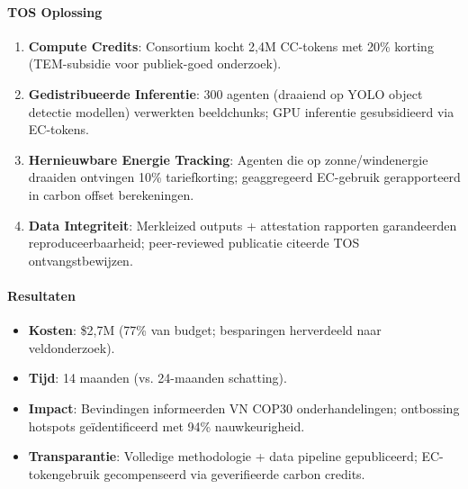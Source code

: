 \documentclass[11pt]{article}
\begin{document}
\paragraph{TOS Oplossing}
\begin{enumerate}[noitemsep]
  \item \textbf{Compute Credits}: Consortium kocht 2,4M CC-tokens met 20\% korting (TEM-subsidie voor publiek-goed onderzoek).
  \item \textbf{Gedistribueerde Inferentie}: 300 agenten (draaiend op YOLO object detectie modellen) verwerkten beeldchunks; GPU inferentie gesubsidieerd via EC-tokens.
  \item \textbf{Hernieuwbare Energie Tracking}: Agenten die op zonne/windenergie draaiden ontvingen 10\% tariefkorting; geaggregeerd EC-gebruik gerapporteerd in carbon offset berekeningen.
  \item \textbf{Data Integriteit}: Merkleized outputs + attestation rapporten garandeerden reproduceerbaarheid; peer-reviewed publicatie citeerde TOS ontvangstbewijzen.
\end{enumerate}

\paragraph{Resultaten}
\begin{itemize}[noitemsep]
  \item \textbf{Kosten}: \$2,7M (77\% van budget; besparingen herverdeeld naar veldonderzoek).
  \item \textbf{Tijd}: 14 maanden (vs. 24-maanden schatting).
  \item \textbf{Impact}: Bevindingen informeerden VN COP30 onderhandelingen; ontbossing hotspots geïdentificeerd met 94\% nauwkeurigheid.
  \item \textbf{Transparantie}: Volledige methodologie + data pipeline gepubliceerd; EC-tokengebruik gecompenseerd via geverifieerde carbon credits.
\end{itemize}
\end{document}
